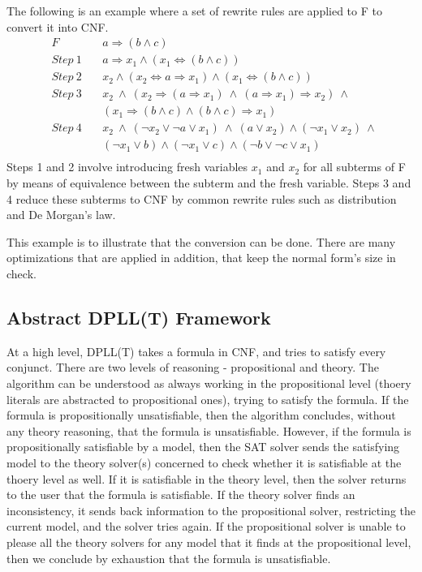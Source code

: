 \documentclass{article}
\begin{document}
The following is an example where a set of rewrite rules
are applied to F to convert it into CNF. 
\begin{align*}
	&F&\ &a \Rightarrow (b \land c) \\
	&Step\ 1&\ &a \Rightarrow x_1 
		\land (x_1 \iff (b \land c)) \\
	&Step\ 2&\ &x_2 \land (x_2 \iff a \Rightarrow x_1) 
		\land (x_1 \iff (b \land c)) \\
	&Step\ 3&\ &x_2\ \land\  
		(x_2 \Rightarrow (a \Rightarrow x_1)\ \land\  
		(a \Rightarrow x_1) \Rightarrow x_2)\ \land\  \\
	& & &(x_1 \Rightarrow (b \land c) \land 
		(b \land c) \Rightarrow x_1) \\
	&Step\ 4&\ &x_2\ \land\ 
		(\neg x_2 \lor \neg a \lor x_1)\ \land\  
		(a \lor x_2) \land (\neg x_1 \lor x_2)\ \land\ \\
	& & &(\neg x_1 \lor b) \land (\neg x_1 \lor c) \land 
		(\neg b \lor \neg c \lor x_1) \\
\end{align*}
Steps 1 and 2 involve introducing fresh variables $x_1$
and $x_2$ for all subterms of F by means of equivalence 
between the subterm and the fresh variable. Steps 3 and 4 
reduce these subterms to CNF by common rewrite rules 
such as distribution and De Morgan's law.

This example is to illustrate that the conversion can be done.
There are many optimizations that are applied in addition, 
that keep the normal form's size in check.


\subsection{Abstract DPLL(T) Framework}
\label{sec:abst}
At a high level, DPLL(T) takes a formula in CNF, and tries 
to satisfy every conjunct. There are two levels of reasoning 
- propositional and theory. The algorithm can be understood as 
always working in the propositional level (thoery literals
are abstracted to propositional ones), trying to 
satisfy the formula. If the formula is propositionally 
unsatisfiable, then the algorithm concludes, without any 
theory reasoning, that the formula is unsatisfiable. However, 
if the formula is propositionally satisfiable by a model, 
then the SAT solver sends the satisfying model to the 
theory solver(s) concerned to check whether it is satisfiable
at the thoery level as well. If it is satisfiable in the 
theory level, then the solver returns to the user that 
the formula is satisfiable. If the theory solver finds an 
inconsistency, it sends back information to the 
propositional solver, restricting the current model, 
and the solver tries again. If the propositional solver 
is unable to please all the theory solvers 
for any model that it finds at the propositional level, then
we conclude by exhaustion that the formula is unsatisfiable.
\end{document}
